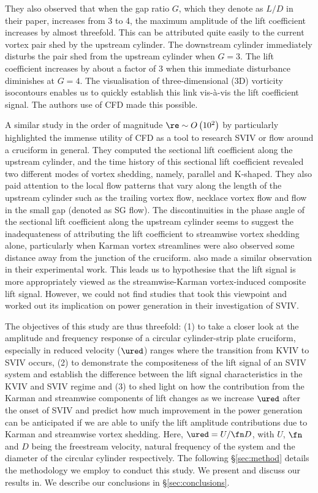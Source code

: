 \documentclass[a4paper,fleqn]{cas-sc}
\begin{document}
They also observed that when the gap ratio $G$, which they denote as  $L/D$  in their paper, increases from 3 to 4, the maximum amplitude of the lift coefficient increases by almost threefold. This can be attributed quite easily to the current vortex pair shed by the upstream cylinder. The downstream cylinder immediately disturbs the pair shed from the upstream cylinder when  $G=3$. The lift coefficient increases by about a factor of 3 when this immediate disturbance diminishes at  $G=4$. The visualisation of three-dimensional (3D) vorticity isocontours enables us to quickly establish this link vis-\`{a}-vis the lift coefficient signal. The authors use of CFD made this possible.

A similar study in the order of magnitude $\re \sim O \left( 10^{2} \right)$ by \citet{Zhao2018a} particularly highlighted the immense utility of CFD as a tool to research SVIV or flow around a cruciform in general. They computed the sectional lift coefficient along the upstream cylinder, and the time history of this sectional lift coefficient revealed two different modes of vortex shedding, namely, parallel and K-shaped. They also paid attention to the local flow patterns that vary along the length of the upstream cylinder such as the trailing vortex flow, necklace vortex flow and flow in the small gap (denoted as SG flow). The discontinuities in the phase angle of the sectional lift coefficient along the upstream cylinder seems to suggest the inadequateness of attributing the lift coefficient to streamwise vortex shedding alone, particularly when Karman vortex streamlines were also observed some distance away from the junction of the cruciform. \citet{Shirakashi1989} also made a similar observation in their experimental work. This leads us to hypothesise that the lift signal is more appropriately viewed as the streamwise-Karman vortex-induced composite lift signal. However, we could not find studies that took this viewpoint and worked out its implication on power generation in their investigation of SVIV.

The objectives of this study are thus threefold: (1) to take a closer look at the amplitude and frequency response of a circular cylinder-strip plate cruciform, especially in reduced velocity ($\ured$) ranges where the transition from KVIV to SVIV occurs, (2) to demonstrate the compositeness of the lift signal of an SVIV system and establish the difference between the lift signal characteristics in the KVIV and SVIV regime and (3) to shed light on how the contribution from the Karman and streamwise components of lift changes as we increase $\ured$ after the onset of SVIV and predict how much improvement in the power generation can be anticipated if we are able to unify the lift amplitude contributions due to Karman and streamwise vortex shedding. Here, $\ured = U/\fn D$, with $U$, $\fn$ and $D$ being the freestream velocity, natural frequency of the system and the diameter of the circular cylinder respectively. The following \S\ref{sec:method} details the methodology we employ to conduct this study. We present and discuss our results in. We describe our conclusions in \S\ref{sec:conclusions}.
\end{document}
